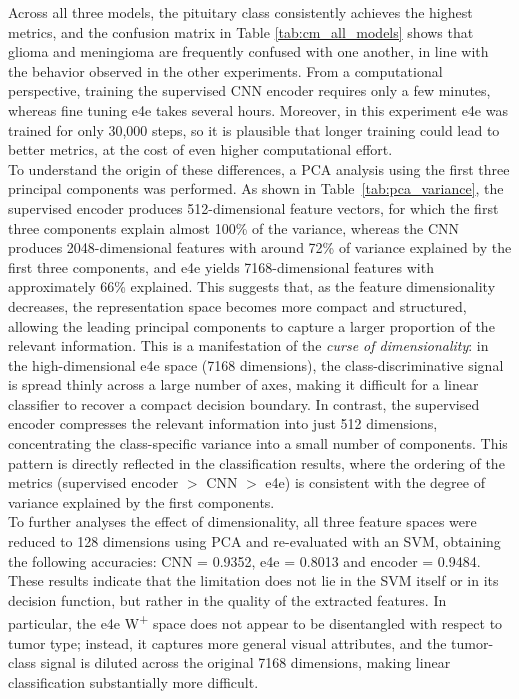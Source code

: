 Across all three models, the pituitary class consistently achieves the highest metrics, and the confusion matrix in Table \ref{tab:cm_all_models} shows that glioma and meningioma are frequently confused with one another, in line with the behavior observed in the other experiments. From a computational perspective, training the supervised CNN encoder requires only a few minutes, whereas fine tuning e4e takes several hours. Moreover, in this experiment e4e was trained for only 30,000 steps, so it is plausible that longer training could lead to better metrics, at the cost of even higher computational effort.\\


To understand the origin of these differences, a PCA analysis using the first three principal components was performed. As shown in Table~\ref{tab:pca_variance}, the supervised encoder produces 512-dimensional feature vectors, for which the first three components explain almost 100\% of the variance, whereas the CNN produces 2048-dimensional features with around 72\% of variance explained by the first three components, and e4e yields 7168-dimensional features with approximately 66\% explained. This suggests that, as the feature dimensionality decreases, the representation space becomes more compact and structured, allowing the leading principal components to capture a larger proportion of the relevant information. This is a manifestation of the \emph{curse of dimensionality}: in the high-dimensional e4e space (7168 dimensions), the class-discriminative signal is spread thinly across a large number of axes, making it difficult for a linear classifier to recover a compact decision boundary. In contrast, the supervised encoder compresses the relevant information into just 512 dimensions, concentrating the class-specific variance into a small number of components. This pattern is directly reflected in the classification results, where the ordering of the metrics (supervised encoder $>$ CNN $>$ e4e) is consistent with the degree of variance explained by the first components.\\

To further analyses the effect of dimensionality, all three feature spaces were reduced to 128 dimensions using PCA and re-evaluated with an SVM, obtaining the following accuracies: CNN = 0.9352, e4e = 0.8013 and encoder = 0.9484. These results indicate that the limitation does not lie in the SVM itself or in its decision function, but rather in the quality of the extracted features. In particular, the e4e W\textsuperscript{+} space does not appear to be disentangled with respect to tumor type; instead, it captures more general visual attributes, and the tumor-class signal is diluted across the original 7168 dimensions, making linear classification substantially more difficult.\\

